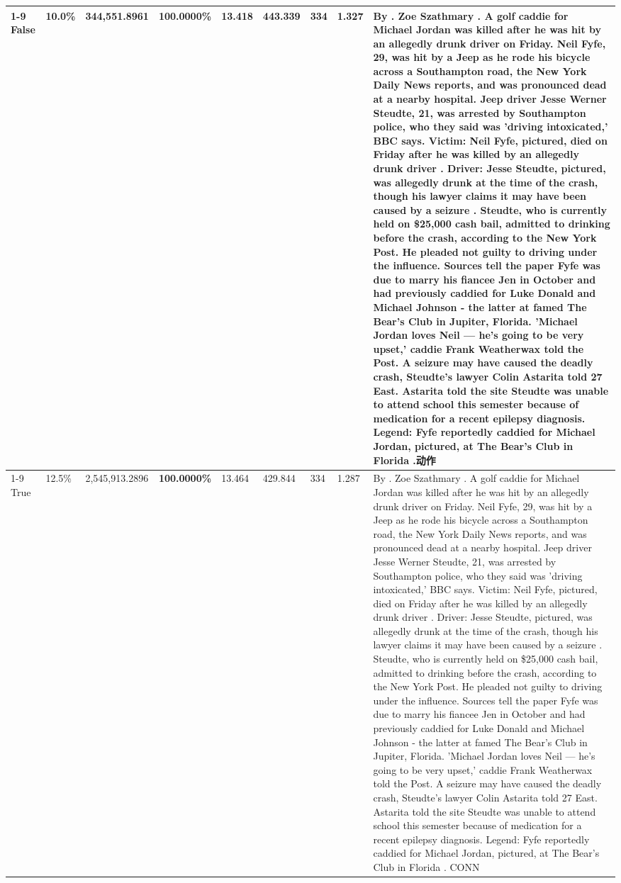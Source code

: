 \begin{table}[H]
\begin{tabular}{lllrlllll}
\cline{1-9}
False & 10.0\% & 344,551.8961 & \bfseries \color{red} 100.0000\% & 13.418 & 443.339 & 334 & 1.327 & By . Zoe Szathmary . A golf caddie for Michael Jordan was killed after he was hit by an allegedly drunk driver on Friday. Neil Fyfe, 29, was hit by a Jeep as he rode his bicycle across a Southampton road, the New York Daily News reports, and was pronounced dead at a nearby hospital. Jeep driver Jesse Werner Steudte, 21, was arrested by Southampton police, who they said was 'driving intoxicated,' BBC says. Victim: Neil Fyfe, pictured, died on Friday after he was killed by an allegedly drunk driver . Driver: Jesse Steudte, pictured, was allegedly drunk at the time of the crash, though his lawyer claims it may have been caused by a seizure . Steudte, who is currently held on \$25,000 cash bail, admitted to drinking before the crash, according to the New York Post. He pleaded not guilty to driving under the influence. Sources tell the paper Fyfe was due to marry his fiancee Jen in October and had previously caddied for Luke Donald and Michael Johnson - the latter at famed The Bear's Club in Jupiter, Florida. 'Michael Jordan loves Neil — he’s going to be very upset,' caddie Frank Weatherwax told the Post. A seizure may have caused the deadly crash, Steudte's lawyer Colin Astarita told 27 East. Astarita told the site Steudte was unable to attend school this semester because of medication for a recent epilepsy diagnosis. Legend: Fyfe reportedly caddied for Michael Jordan, pictured, at The Bear's Club in Florida .动作 \\
\cline{1-9}
True & 12.5\% & 2,545,913.2896 & \bfseries \color{red} 100.0000\% & 13.464 & 429.844 & 334 & 1.287 & By . Zoe Szathmary . A golf caddie for Michael Jordan was killed after he was hit by an allegedly drunk driver on Friday. Neil Fyfe, 29, was hit by a Jeep as he rode his bicycle across a Southampton road, the New York Daily News reports, and was pronounced dead at a nearby hospital. Jeep driver Jesse Werner Steudte, 21, was arrested by Southampton police, who they said was 'driving intoxicated,' BBC says. Victim: Neil Fyfe, pictured, died on Friday after he was killed by an allegedly drunk driver . Driver: Jesse Steudte, pictured, was allegedly drunk at the time of the crash, though his lawyer claims it may have been caused by a seizure . Steudte, who is currently held on \$25,000 cash bail, admitted to drinking before the crash, according to the New York Post. He pleaded not guilty to driving under the influence. Sources tell the paper Fyfe was due to marry his fiancee Jen in October and had previously caddied for Luke Donald and Michael Johnson - the latter at famed The Bear's Club in Jupiter, Florida. 'Michael Jordan loves Neil — he’s going to be very upset,' caddie Frank Weatherwax told the Post. A seizure may have caused the deadly crash, Steudte's lawyer Colin Astarita told 27 East. Astarita told the site Steudte was unable to attend school this semester because of medication for a recent epilepsy diagnosis. Legend: Fyfe reportedly caddied for Michael Jordan, pictured, at The Bear's Club in Florida . CONN \\

\end{tabular}
\end{table}
